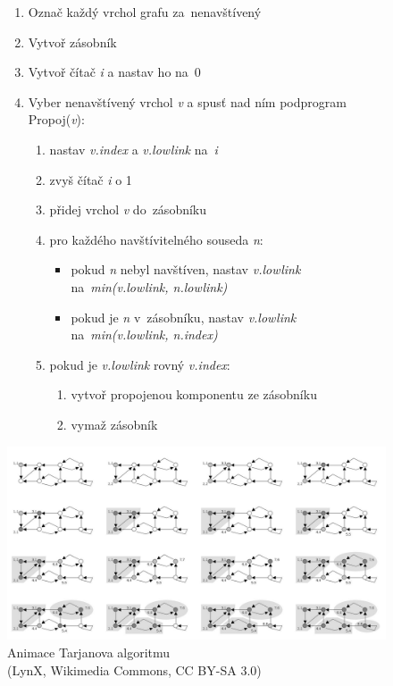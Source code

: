 \begin{figure}[ht]
\onehalfspacing
\begin{enumerate}
\item Označ každý vrchol grafu za~nenavštívený
\item Vytvoř zásobník
\item Vytvoř čítač \emph{i} a nastav ho na~0
\item Vyber nenavštívený vrchol \emph{v} a spusť nad ním podprogram Propoj(\emph{v}):
    \begin{enumerate}
    \item nastav \emph{v.index} a \emph{v.lowlink} na~\emph{i}
    \item zvyš čítač \emph{i} o 1
    \item přidej vrchol \emph{v} do~zásobníku
    \item pro každého navštívitelného souseda \emph{n}:
        \begin{itemize}
        \item pokud \emph{n} nebyl navštíven, nastav \emph{v.lowlink} na~\emph{min(v.lowlink, n.lowlink)}
        \item pokud je \emph{n} v~zásobníku, nastav \emph{v.lowlink} na~\emph{min(v.lowlink, n.index)}
        \end{itemize}
    \item pokud je \emph{v.lowlink} rovný \emph{v.index}:
        \begin{enumerate}
        \item vytvoř propojenou komponentu ze zásobníku
        \item vymaž zásobník
        \end{enumerate}
    \end{enumerate}
\end{enumerate}
\end{figure}
\FloatBarrier

\begin{figure}[ht]
\centering
\includegraphics[width=\textwidth]{images/3_tarjanuv-algoritmus-animace.png}

\caption[Animace Tarjanova algoritmu]{Animace Tarjanova algoritmu\\{\small (LynX, Wikimedia Commons, CC BY-SA 3.0)}}
\end{figure}

